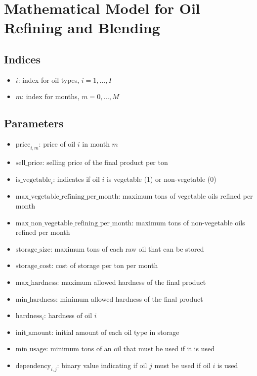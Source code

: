 \documentclass{article}
\begin{document}
\section*{Mathematical Model for Oil Refining and Blending}

\subsection*{Indices}
\begin{itemize}
    \item \( i \): index for oil types, \( i = 1, \ldots, I \)
    \item \( m \): index for months, \( m = 0, \ldots, M \)
\end{itemize}

\subsection*{Parameters}
\begin{itemize}
    \item \( \text{price}_{i,m} \): price of oil \( i \) in month \( m \)
    \item \( \text{sell\_price} \): selling price of the final product per ton
    \item \( \text{is\_vegetable}_{i} \): indicates if oil \( i \) is vegetable (1) or non-vegetable (0)
    \item \( \text{max\_vegetable\_refining\_per\_month} \): maximum tons of vegetable oils refined per month
    \item \( \text{max\_non\_vegetable\_refining\_per\_month} \): maximum tons of non-vegetable oils refined per month
    \item \( \text{storage\_size} \): maximum tons of each raw oil that can be stored
    \item \( \text{storage\_cost} \): cost of storage per ton per month
    \item \( \text{max\_hardness} \): maximum allowed hardness of the final product
    \item \( \text{min\_hardness} \): minimum allowed hardness of the final product
    \item \( \text{hardness}_{i} \): hardness of oil \( i \)
    \item \( \text{init\_amount} \): initial amount of each oil type in storage
    \item \( \text{min\_usage} \): minimum tons of an oil that must be used if it is used
    \item \( \text{dependency}_{i,j} \): binary value indicating if oil \( j \) must be used if oil \( i \) is used
\end{itemize}
\end{document}
